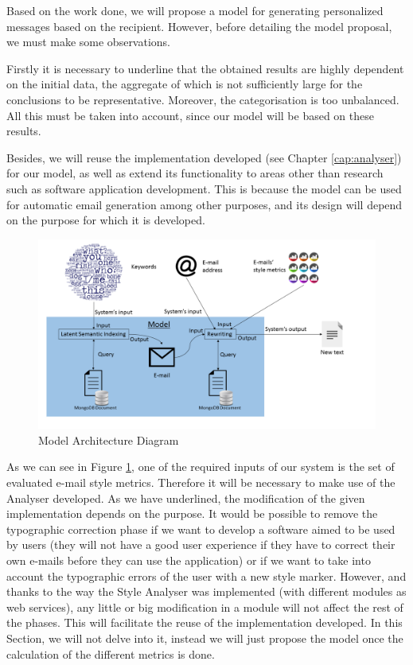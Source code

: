 Based on the work done, we will propose a model for generating personalized messages based on the recipient. However, before detailing the model proposal, we must make some observations.

Firstly it is necessary to underline that the obtained results are highly dependent on the initial data, the aggregate of which is not sufficiently large for the conclusions to be representative. Moreover, the categorisation is too unbalanced. All this must be taken into account, since our model will be based on these results.

Besides, we will reuse the implementation developed (see Chapter \ref{cap:analyser}) for our model, as well as extend its functionality to areas other than research such as software application development. This is because the model can be used for automatic email generation among other purposes, and its design will depend on the purpose for which it is developed.

\begin{figure}
	\centering%
	\centerline{\includegraphics[width = 1.2\textwidth]{Imagenes/Bitmap/model.png}}%
	\caption{Model Architecture Diagram}%
	\label{fig:modarch}
\end{figure}

As we can see in Figure \ref{fig:modarch}, one of the required inputs of our system is the set of evaluated e-mail style metrics. Therefore it will be necessary to make use of the Analyser developed. As we have underlined, the modification of the given implementation depends on the purpose. It would be possible to remove the typographic correction phase if we want to develop a software aimed to be used by users (they will not have a good user experience if they have to correct their own e-mails before they can use the application) or if we want to take into account the typographic errors of the user with a new style marker. However, and thanks to the way the Style Analyser was implemented (with different modules as web services), any little or big modification in a module will not affect the rest of the phases. This will facilitate the reuse of the implementation developed. In this Section, we will not delve into it, instead we will just propose the model once the calculation of the different metrics is done.

